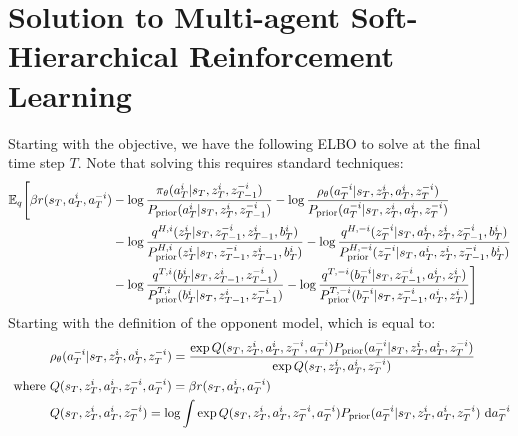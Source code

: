 \section{Solution to Multi-agent Soft-Hierarchical Reinforcement Learning}
\label{appx:chap4-soft-multi-HRL}
Starting with the objective, we have the following ELBO to solve at the final time step $T$. Note that solving this requires standard techniques: 
\begin{equation}
\begin{aligned}
    \mathbb{E}_q\Bigg[\beta r(s_T, a_T^i, a^{-i}_T) &- \log\frac{\pi_\theta(a^i_T | s_T, z^i_T, z^{-i}_{T-1})}{P_{\text{prior}}(a^i_T | s_T, z^i_T, z^{-i}_{T-1})} - \log\frac{\rho_\theta(a^{-i}_T | s_T, z^i_T, a^i_T, z^{-i}_T) }{P_{\text{prior}}(a^{-i}_T | s_T, z^i_T, a^i_T, z^{-i}_T)} \\
    &- \log\frac{q^{H, i}(z^i_T | s_T, z^{-i}_{T-1}, z^i_{T-1}, b^i_T)}{P^{H, i}_{\text{prior}}(z^i_T | s_T, z^{-i}_{T-1}, z^i_{T-1}, b^i_T)} - \log\frac{q^{H, -i}(z^{-i}_T | s_T, a^i_T, z^i_T, z^{-i}_{T-1}, b^i_T)}{P^{H, -i}_{\text{prior}}(z^{-i}_T | s_T, a^i_T, z^i_T, z^{-i}_{T-1}, b^i_T)} \\
    &- \log\frac{q^{T,i}(b^i_T | s_T, z^i_{T-1}, z^{-i}_{T-1})}{P^{T,i}_{\text{prior}}(b^i_T | s_T, z^i_{T-1}, z^{-i}_{T-1})} - \log\frac{q^{T,-i}(b^{-i}_T | s_T,  z^{-i}_{T-1}, a^i_T, z^i_T)}{P^{T,-i}_{\text{prior}}(b^{-i}_T | s_T,  z^{-i}_{T-1}, a^i_T, z^i_T) } \Bigg]
\end{aligned}
\end{equation}
Starting with the definition of the opponent model, which is equal to:
\begin{equation*}
\begin{aligned}
    &\rho_\theta(a^{-i}_T | s_T, z^i_T, a^{i}_T, z^{-i}_T) = \frac{\exp Q(s_T, z^i_T, a^{i}_T, z^{-i}_T, a^{-i}_T) P_{\text{prior}}(a^{-i}_T | s_T, z^i_T, a^{i}_T, z^{-i}_T)}{\exp Q(s_T, z^i_T, a^{i}_T, z^{-i}_T)} \\
    \text{ where }& Q(s_T, z^i_T, a^{i}_T, z^{-i}_T, a^{-i}_T) = \beta r(s_T, a^i_T, a^{-i}_T) \\
    &Q(s_T, z^i_T, a^{i}_T, z^{-i}_T) = \log \int \exp Q(s_T, z^i_T, a^{i}_T, z^{-i}_T, a^{-i}_T) P_{\text{prior}}(a^{-i}_T | s_T, z^i_T, a^{i}_T, z^{-i}_T) \ \mathrm{d} a^{-i}_T
\end{aligned}
\end{equation*}
